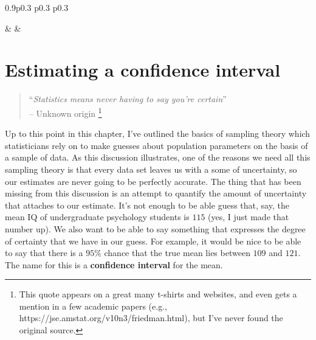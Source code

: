 \documentclass[
  a4paper,
]{book}
\begin{document}
\begin{table}[ht]
\begin{centerbox}
\begin{threeparttable}
\begin{tabularx}{0.9\textwidth}{p{} p{} p{}}
\hhline{}

 &
 &
 \tabularnewline[-0.5pt]


\end{tabularx} 

\end{threeparttable}\par\end{centerbox}

\end{table}
 

\hypertarget{sec-Estimating-a-confidence-interval}{%
\section{Estimating a confidence
interval}\label{sec-Estimating-a-confidence-interval}}

\begin{quote}
``\emph{Statistics means never having to say you're certain}''\\
-- Unknown origin \footnote{This quote appears on a great many t-shirts
  and websites, and even gets a mention in a few academic papers (e.g.,
  https://jse.amstat.org/v10n3/friedman.html), but I've never found the
  original source.}
\end{quote}

Up to this point in this chapter, I've outlined the basics of sampling
theory which statisticians rely on to make guesses about population
parameters on the basis of a sample of data. As this discussion
illustrates, one of the reasons we need all this sampling theory is that
every data set leaves us with a some of uncertainty, so our estimates
are never going to be perfectly accurate. The thing that has been
missing from this discussion is an attempt to quantify the amount of
uncertainty that attaches to our estimate. It's not enough to be able
guess that, say, the mean IQ of undergraduate psychology students is
\(115\) (yes, I just made that number up). We also want to be able to
say something that expresses the degree of certainty that we have in our
guess. For example, it would be nice to be able to say that there is a
\(95\%\) chance that the true mean lies between \(109\) and \(121\). The
name for this is a \textbf{confidence interval} for the mean.
\end{document}
